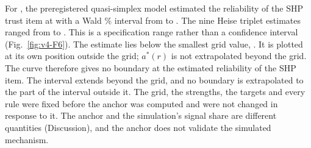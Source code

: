For , the preregistered quasi-simplex model estimated the reliability of the SHP trust item at  with a Wald \% interval from  to . The nine Heise triplet estimates ranged from  to . This is a specification range rather than a confidence interval (Fig.~\ref{fig:v4-F6}). %
The estimate lies below the smallest grid value, . It is plotted at its own position outside the grid; $a^*(r)$ is not extrapolated beyond the grid. %
The curve therefore gives no boundary at the estimated reliability of the SHP item. %
The interval extends beyond the grid, and no boundary is extrapolated to the part of the interval outside it. %
The grid, the strengths, the targets and every rule were fixed before the anchor was computed and were not changed in response to it. %
The anchor and the simulation's signal share are different quantities (Discussion), and the anchor does not validate the simulated mechanism. %


